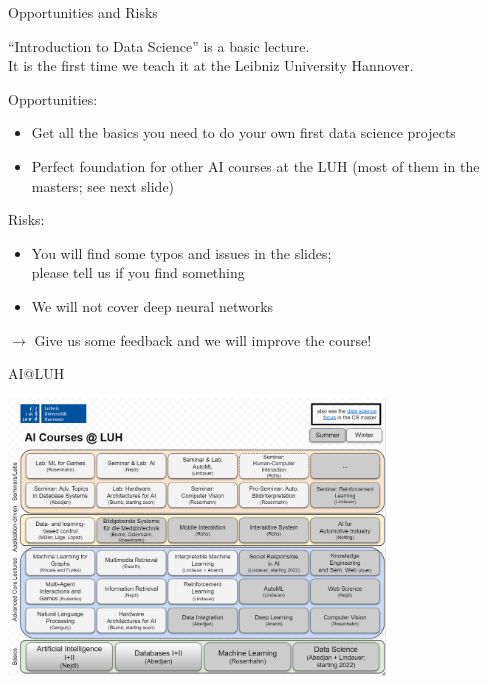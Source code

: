 \documentclass[aspectratio=169]{../latex_main/tntbeamer}  %
\begin{document}
\begin{frame}[c]{Opportunities and Risks}

``Introduction to Data Science'' is a basic lecture.\\ It is the first time we teach it at the Leibniz University Hannover.

\bigskip
\pause

Opportunities:
\begin{itemize}
  \item Get all the basics you need to do your own first data science projects
  \item Perfect foundation for other AI courses at the LUH (most of them in the masters; see next slide)
\end{itemize}

\medskip

Risks:
\begin{itemize}
  \item You will find some typos and issues in the slides;\\ please tell us if you find something
  \item We will not cover deep neural networks
\end{itemize}

\medskip
$\to$ Give us some feedback and we will improve the course!

\end{frame}
\begin{frame}[c]{AI@LUH}

\centering
\vspace{-1.3cm}
\includegraphics[width=0.75\textwidth]{./figures/ai_luh.PNG}

\end{frame}
\end{document}
